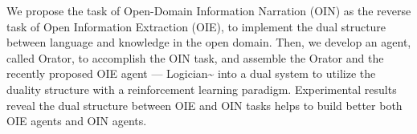 We propose the task of Open-Domain Information Narration (OIN) as the reverse task of Open Information Extraction (OIE), to implement the dual structure between language and knowledge in the open domain. Then, we develop an agent, called Orator, to accomplish the OIN task, and assemble the Orator and the recently proposed OIE agent --- Logician{\textasciitilde}\cite{Sun2018} into a dual system to utilize the duality structure with a reinforcement learning paradigm. Experimental results reveal the dual structure between OIE and OIN tasks helps to build better both OIE agents and OIN agents.
